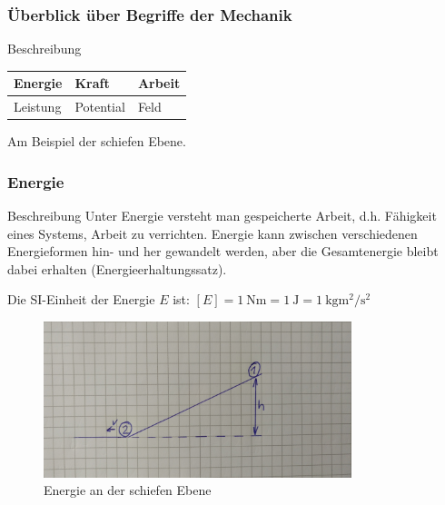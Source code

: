 \documentclass{article}
\begin{document}
\frame
{
  \frametitle{Überblick über Begriffe der Mechanik}
\begin{block}{Beschreibung}
\vspace{0.5cm}
\begin{tabular}{|>{\centering\arraybackslash}p{3cm}|>{\centering\arraybackslash}p{3cm}|>{\centering\arraybackslash}p{3cm}|}
\hline
\rule[-1ex]{0pt}{2.5ex} Energie & Kraft & Arbeit \\
\hline 
\rule[-1ex]{0pt}{2.5ex} Leistung & Potential & Feld \\ 
\hline 
\end{tabular}
\vspace{0.5cm}
\end{block}
Am Beispiel der schiefen Ebene.
}

\frame
{
  \frametitle{Energie}
\begin{block}{Beschreibung}
Unter Energie versteht man gespeicherte Arbeit, d.h. Fähigkeit eines Systems, Arbeit zu verrichten. Energie kann zwischen verschiedenen Energieformen hin- und her gewandelt werden, aber die Gesamtenergie bleibt dabei erhalten (Energieerhaltungssatz).
\end{block}
Die SI-Einheit der Energie $E$ ist:
$[E]=\SI{1}{\newton\meter}=\SI{1}{\joule}=\SI{1}{\kilo\gram\square\meter\per\square\second}$
      \begin{figure}
	  \includegraphics[width=0.8\textwidth]{Energie_1}
	  \vspace{-3mm}
	  \caption{Energie an der schiefen Ebene}
   \end{figure}
}
\end{document}
